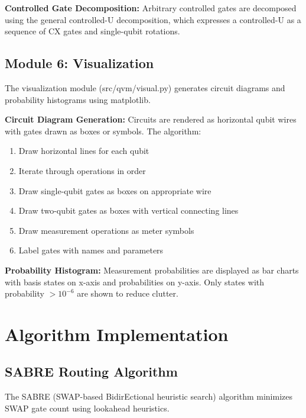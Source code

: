 \textbf{Controlled Gate Decomposition:}
Arbitrary controlled gates are decomposed using the general controlled-U decomposition, which expresses a controlled-U as a sequence of CX gates and single-qubit rotations.

\subsection{Module 6: Visualization}
The visualization module (src/qvm/visual.py) generates circuit diagrams and probability histograms using matplotlib.

\textbf{Circuit Diagram Generation:}
Circuits are rendered as horizontal qubit wires with gates drawn as boxes or symbols. The algorithm:
\begin{enumerate}
\item Draw horizontal lines for each qubit
\item Iterate through operations in order
\item Draw single-qubit gates as boxes on appropriate wire
\item Draw two-qubit gates as boxes with vertical connecting lines
\item Draw measurement operations as meter symbols
\item Label gates with names and parameters
\end{enumerate}

\textbf{Probability Histogram:}
Measurement probabilities are displayed as bar charts with basis states on x-axis and probabilities on y-axis. Only states with probability $> 10^{-6}$ are shown to reduce clutter.

\section{Algorithm Implementation}

\subsection{SABRE Routing Algorithm}
The SABRE (SWAP-based BidirEctional heuristic search) algorithm minimizes SWAP gate count using lookahead heuristics.

